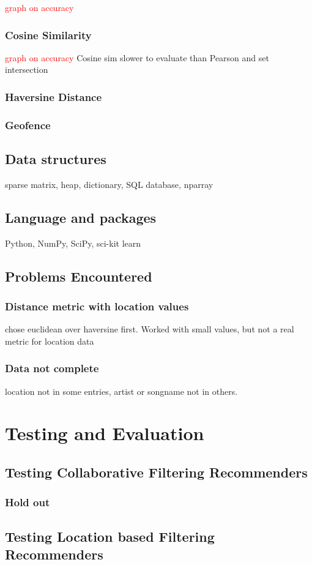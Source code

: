 \documentclass[12pt]{article}
\newcommand\todo[1]{\textcolor{red}{#1}}
\begin{document}
		  \todo{ graph on accuracy}
		  \subsubsection{Cosine Similarity}
		  \todo{ graph on accuracy}	  
		  Cosine sim slower to evaluate than Pearson and set intersection	
		  \subsubsection{Haversine Distance}
		  \subsubsection{Geofence}
	\subsection{Data structures}
	sparse matrix, heap, dictionary, SQL database, nparray
	\subsection{Language and packages}
	Python, NumPy, SciPy, sci-kit learn
	\subsection{Problems Encountered}
		\subsubsection{Distance metric with location values}
			chose euclidean over haversine first. Worked with small values, but not a real metric for location data
		\subsubsection{Data not complete}
			location not in some entries, artist or songname not in others.	
\pagebreak
\section{Testing and Evaluation}
	\subsection{Testing Collaborative Filtering Recommenders}
		\subsubsection{Hold out}
	\subsection{Testing Location based Filtering Recommenders}
\end{document}

